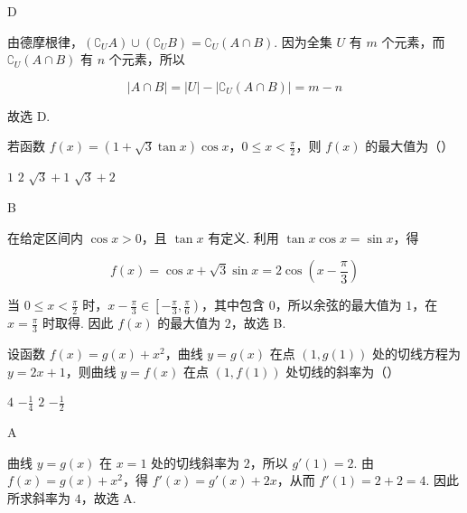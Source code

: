 \begin{answer}
D
\end{answer}

\begin{solution}
由德摩根律，\((\complement_U A)\cup(\complement_U B)=\complement_U(A\cap B)\). 因为全集 \(U\) 有 \(m\) 个元素，而 \(\complement_U(A\cap B)\) 有 \(n\) 个元素，所以

\[
|A\cap B|=|U|-|\complement_U(A\cap B)|=m-n
\]

故选 D.
\end{solution}

\begin{problem}
若函数 \(f(x) = (1 + \sqrt{3}\tan x)\cos x\)，\(0 \leqslant x < \frac{\pi}{2}\)，则 \( f(x) \) 的最大值为（\quad）

\choices
    {\(1\)}
    {\(2\)}
    {\( \sqrt{3} + 1 \)}
    {\( \sqrt{3} + 2 \)}
\end{problem}

\begin{answer}
B
\end{answer}

\begin{solution}
在给定区间内 \(\cos x>0\)，且 \(\tan x\) 有定义. 利用 \(\tan x\cos x=\sin x\)，得

\[
f(x)=\cos x+\sqrt3\sin x=2\cos\left(x-\frac\pi3\right)
\]

当 \(0\leqslant x<\frac\pi2\) 时，\(x-\frac\pi3\in\left[-\frac\pi3,\frac\pi6\right)\)，其中包含 \(0\)，所以余弦的最大值为 \(1\)，在 \(x=\frac\pi3\) 时取得. 因此 \(f(x)\) 的最大值为 \(2\)，故选 B.
\end{solution}

\begin{problem}
设函数 \( f(x) = g(x) + x^2 \)，曲线 \( y = g(x) \) 在点 \((1, g(1))\) 处的切线方程为 \( y = 2x + 1 \)，则曲线 \( y = f(x) \) 在点 \((1, f(1))\) 处切线的斜率为（\quad）

\choices
    {\(4\)}
    {\(-\frac{1}{4}\)}
    {\(2\)}
    {\(-\frac{1}{2}\)}
\end{problem}

\begin{answer}
A
\end{answer}

\begin{solution}
曲线 \(y=g(x)\) 在 \(x=1\) 处的切线斜率为 \(2\)，所以 \(g'(1)=2\). 由 \(f(x)=g(x)+x^2\)，得 \(f'(x)=g'(x)+2x\)，从而 \(f'(1)=2+2=4\). 因此所求斜率为 \(4\)，故选 A.
\end{solution}

